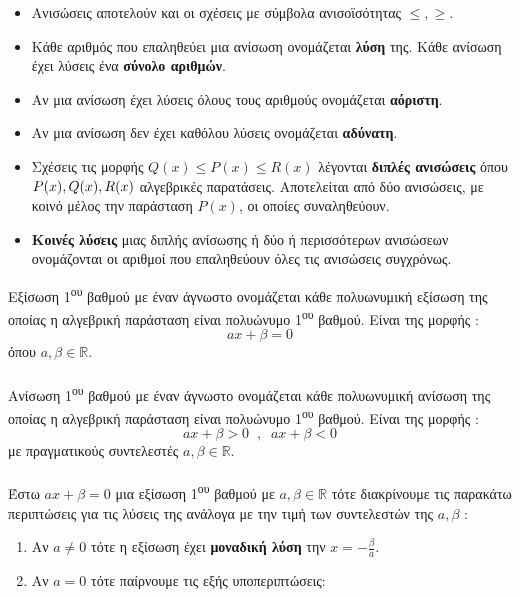 \begin{itemize}[itemsep=0mm]
\item Ανισώσεις αποτελούν και οι σχέσεις με σύμβολα ανισοϊσότητας $ \leq,\geq $.
\item Κάθε αριθμός που επαληθεύει μια ανίσωση ονομάζεται \textbf{λύση} της. Κάθε ανίσωση έχει λύσεις ένα \textbf{σύνολο αριθμών}.
\item Αν μια ανίσωση έχει λύσεις όλους τους αριθμούς ονομάζεται \textbf{αόριστη}.
\item Αν μια ανίσωση δεν έχει καθόλου λύσεις ονομάζεται \textbf{αδύνατη}.
\item Σχέσεις τις μορφής $ Q(x)\leq P(x)\leq R(x) $ λέγονται \textbf{διπλές ανισώσεις} όπου $ P(x),Q(x),\\R(x) $ αλγεβρικές παρατάσεις. Αποτελείται από δύο ανισώσεις, με κοινό μέλος την παράσταση $ P(x) $, οι οποίες συναληθεύουν.
\item \textbf{Κοινές λύσεις} μιας διπλής ανίσωσης ή δύο ή περισσότερων ανισώσεων ονομάζονται οι αριθμοί που επαληθεύουν όλες τις ανισώσεις συγχρόνως.
\end{itemize}
Εξίσωση 1\textsuperscript{ου} βαθμού με έναν άγνωστο ονομάζεται κάθε πολυωνυμική εξίσωση της οποίας η αλγεβρική παράσταση είναι πολυώνυμο 1\textsuperscript{ου} βαθμού. Είναι της μορφής :
\[ ax+\beta=0 \]
όπου $ a,\beta\in\mathbb{R} $.\\\\
Ανίσωση 1\textsuperscript{ου} βαθμού με έναν άγνωστο ονομάζεται κάθε πολυωνυμική ανίσωση της οποίας η αλγεβρική παράσταση είναι πολυώνυμο 1\textsuperscript{ου} βαθμού. Είναι της μορφής :
\[ ax+\beta>0\;\;,\;\;ax+\beta<0 \] με πραγματικούς συντελεστές $ a,\beta\in\mathbb{R} $.\\\\
\thewrhmata
{}
Έστω $ ax+\beta=0 $ μια εξίσωση 1\textsuperscript{ου} βαθμού με $ a,\beta\in\mathbb{R} $ τότε διακρίνουμε τις παρακάτω περιπτώσεις για τις λύσεις της ανάλογα με την τιμή των συντελεστών της $ a,\beta $ :
\begin{enumerate}
\item Αν $ a\neq0 $ τότε η εξίσωση έχει \textbf{μοναδική λύση} την $ x=-\frac{\beta}{a} $.
\item Αν $ a=0 $ τότε παίρνουμε τις εξής υποπεριπτώσεις:
\end{enumerate}
